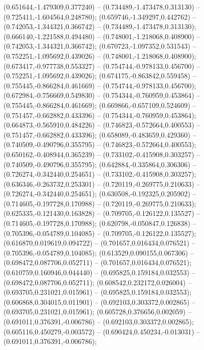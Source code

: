  (0.651644,-1.479309,0.377240) -- (0.734489,-1.473478,0.313130) -- (0.725411,-1.604564,0.248780);
 (0.659746,-1.349297,0.442762) -- (0.742053,-1.344321,0.366742) -- (0.734489,-1.473478,0.313130);
 (0.666140,-1.221588,0.494480) -- (0.748001,-1.218068,0.408900) -- (0.742053,-1.344321,0.366742);
 (0.670723,-1.097352,0.531543) -- (0.752251,-1.095692,0.439026) -- (0.748001,-1.218068,0.408900);
 (0.673417,-0.977738,0.553327) -- (0.754744,-0.978133,0.456700) -- (0.752251,-1.095692,0.439026);
 (0.674175,-0.863842,0.559458) -- (0.755445,-0.866284,0.461669) -- (0.754744,-0.978133,0.456700);
 (0.672984,-0.756669,0.549830) -- (0.754344,-0.760959,0.453864) -- (0.755445,-0.866284,0.461669);
 (0.669866,-0.657109,0.524609) -- (0.751457,-0.662882,0.433396) -- (0.754344,-0.760959,0.453864);
 (0.664873,-0.565910,0.484226) -- (0.746823,-0.572664,0.400553) -- (0.751457,-0.662882,0.433396);
 (0.658089,-0.483659,0.429360) -- (0.740509,-0.490796,0.355795) -- (0.746823,-0.572664,0.400553);
 (0.650162,-0.408944,0.365239) -- (0.733102,-0.415908,0.303257) -- (0.740509,-0.490796,0.355795);
 (0.642884,-0.335864,0.306306) -- (0.726274,-0.342440,0.254651) -- (0.733102,-0.415908,0.303257);
 (0.636346,-0.263732,0.253301) -- (0.720119,-0.269775,0.210633) -- (0.726274,-0.342440,0.254651);
 (0.630508,-0.192325,0.205902) -- (0.714605,-0.197728,0.170988) -- (0.720119,-0.269775,0.210633);
 (0.625335,-0.121430,0.163828) -- (0.709705,-0.126122,0.135527) -- (0.714605,-0.197728,0.170988);
 (0.620798,-0.050847,0.126838) -- (0.705396,-0.054789,0.104085) -- (0.709705,-0.126122,0.135527);
 (0.616870,0.019619,0.094722) -- (0.701657,0.016434,0.076521) -- (0.705396,-0.054789,0.104085);
 (0.613529,0.090155,0.067306) -- (0.698472,0.087706,0.052711) -- (0.701657,0.016434,0.076521);
 (0.610759,0.160946,0.044440) -- (0.695825,0.159184,0.032553) -- (0.698472,0.087706,0.052711);
 (0.608542,0.232172,0.026004) -- (0.693705,0.231021,0.015961) -- (0.695825,0.159184,0.032553);
 (0.606868,0.304015,0.011901) -- (0.692103,0.303372,0.002865) -- (0.693705,0.231021,0.015961);
 (0.605728,0.376656,0.002059) -- (0.691011,0.376391,-0.006786) -- (0.692103,0.303372,0.002865);
 (0.605116,0.450279,-0.003572) -- (0.690424,0.450234,-0.013031) -- (0.691011,0.376391,-0.006786);
